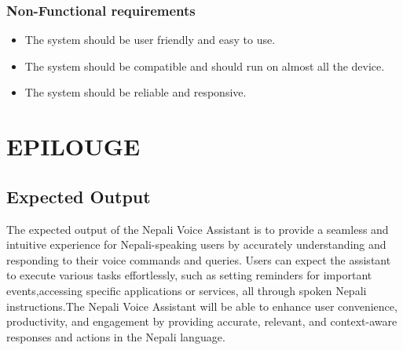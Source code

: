 \subsection{Non-Functional requirements}

\begin{itemize}


	\item The system should be user friendly and easy to use.
	\item The system should be compatible and should run on almost all the device.
	\item The system should be reliable and responsive.
 
\end{itemize}

\chapter{EPILOUGE}

\section{Expected Output}
The expected output of the Nepali Voice Assistant is to provide a seamless and intuitive experience for Nepali-speaking users by accurately understanding and responding to their voice commands and queries. Users can expect the assistant to execute various tasks effortlessly, such as setting reminders for important events,accessing specific applications or services, all through spoken Nepali instructions.The Nepali Voice Assistant will be able to enhance user convenience, productivity, and engagement by providing accurate, relevant, and context-aware responses and actions in the Nepali language.




\newpage
\renewcommand\bibname{REFERENCES} %










	


